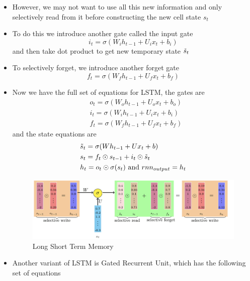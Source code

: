 \documentclass[a4paper]{article}
\begin{document}
\begin{itemize}
    \item However, we may not want to use all this new information and only selectively read from it before constructing the new cell state $s_t$
    \item To do this we introduce another gate called the input gate
    \begin{equation*}
        i_t=\sigma(W_ih_{t-1}+U_ix_t+b_i)
    \end{equation*}
    and then take dot product to get new temporary state $\Tilde{s}_t$
    \item To selectively forget, we introduce another forget gate
    \begin{equation*}
        f_t=\sigma(W_fh_{t-1}+U_fx_t+b_f)
    \end{equation*}
    \item Now we have the full set of equations for LSTM, the gates are
    \begin{equation*}
        \begin{split}
            &o_t=\sigma(W_oh_{t-1}+U_ox_t+b_o)\\
            &i_t=\sigma(W_ih_{t-1}+U_ix_t+b_i)\\
            &f_t=\sigma(W_fh_{t-1}+U_fx_t+b_f)
        \end{split}
    \end{equation*}
    and the state equations are
    \begin{equation*}
        \begin{split}
            &\Tilde{s}_t=\sigma(Wh_{t-1}+Ux_t+b)\\
            &s_t=f_t\odot s_{t-1}+i_t\odot \Tilde{s}_t\\
            &h_t=o_t\odot \sigma(s_t)\text{ and }rnn_{output}=h_t
        \end{split}
    \end{equation*}
    \begin{figure}[H]
        \centering
        \includegraphics[width=0.8\linewidth]{Degree//static/DL_LSTM.png}
        \caption{Long Short Term Memory}
    \end{figure}
    \item Another variant of LSTM is Gated Recurrent Unit, which has the following set of equations

\end{itemize}
\end{document}
